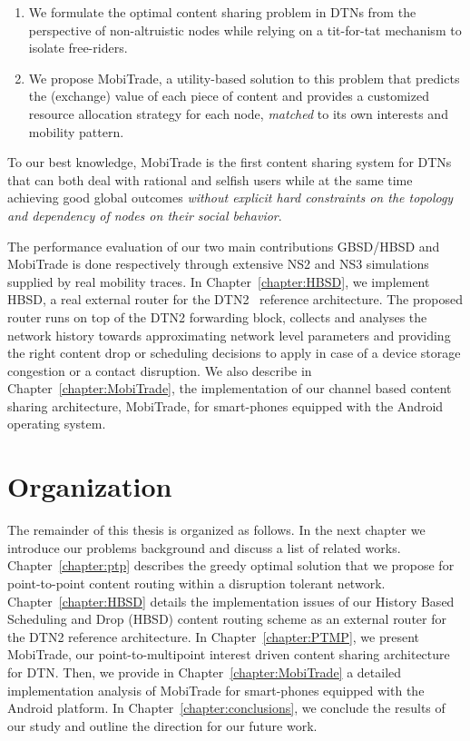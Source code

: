 \begin{enumerate}
    \item We formulate the optimal content sharing problem in DTNs from the perspective of non-altruistic nodes while relying on a tit-for-tat mechanism to isolate free-riders.
    \item We propose MobiTrade, a utility-based solution to this problem that predicts the (exchange) value of each piece of content and provides a customized resource allocation strategy for each node, \emph{matched} to its own interests and mobility pattern.
\end{enumerate}
To our best knowledge, MobiTrade is the first content sharing system for DTNs that can both deal with rational and selfish users while at the same time achieving good global outcomes \emph{without explicit hard constraints on the topology and dependency of nodes on their social behavior}. 

The performance evaluation of our two main contributions GBSD/HBSD and MobiTrade is done respectively through extensive NS2 and NS3 simulations supplied by real mobility traces. In Chapter~\ref{chapter:HBSD}, we implement HBSD, a real external router for the DTN2~\cite{HBSDDTN2} reference architecture. The proposed router runs on top of the DTN2 forwarding block, collects and analyses the network history towards approximating network level parameters and providing the right content drop or scheduling decisions to apply in case of a device storage congestion or a contact disruption. We also describe in Chapter~\ref{chapter:MobiTrade}, the implementation of our channel based content sharing architecture, MobiTrade, for smart-phones equipped with the Android operating system. 

\section{Organization}

The remainder of this thesis is organized as follows. In the next chapter we introduce our problems background and discuss a list of related works. Chapter~\ref{chapter:ptp} describes the greedy optimal solution that we propose for point-to-point content routing within a disruption tolerant network. Chapter~\ref{chapter:HBSD} details the implementation issues of our History Based Scheduling and Drop (HBSD) content routing scheme as an external router for the DTN2 reference architecture. In Chapter~\ref{chapter:PTMP}, we present MobiTrade, our point-to-multipoint interest driven content sharing architecture for DTN. Then, we provide in Chapter~\ref{chapter:MobiTrade} a detailed implementation analysis of MobiTrade for smart-phones equipped with the Android platform. In Chapter~\ref{chapter:conclusions}, we conclude the results of our study and outline the direction for our future work.

